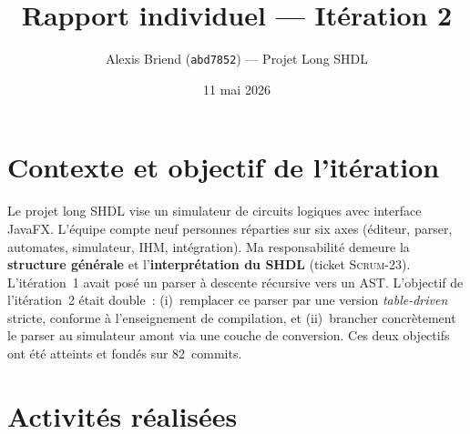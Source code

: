 \documentclass[11pt,a4paper]{article}
\title{\vspace{-1.5cm}Rapport individuel --- It\'eration 2}
\author{Alexis Briend (\texttt{abd7852}) --- Projet Long SHDL}
\date{11 mai 2026}
\begin{document}
\maketitle
\vspace{-1.5em}

\section*{Contexte et objectif de l'it\'eration}

Le projet long SHDL vise un simulateur de circuits logiques avec interface JavaFX. L'\'equipe compte neuf personnes r\'eparties sur six axes (\'editeur, parser, automates, simulateur, IHM, int\'egration). Ma responsabilit\'e demeure la \textbf{structure g\'en\'erale} et l'\textbf{interpr\'etation du SHDL} (ticket \textsc{Scrum-23}). L'it\'eration~1 avait pos\'e un parser \`a descente r\'ecursive vers un AST. L'objectif de l'it\'eration~2 \'etait double~: (i)~remplacer ce parser par une version \emph{table-driven} stricte, conforme \`a l'enseignement de compilation, et (ii)~brancher concr\`etement le parser au simulateur amont via une couche de conversion. Ces deux objectifs ont \'et\'e atteints et fond\'es sur 82~commits.

\section*{Activit\'es r\'ealis\'ees}
\end{document}
